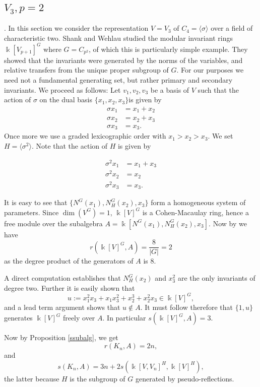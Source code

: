 \documentclass[a4paper]{amsart}
\newcommand{\kk}{\Bbbk}
\newtheorem*{Corollary of Conjecture}{Corollary of Conjecture}
\theoremstyle{definition}
\theoremstyle{remark}
\theoremstyle{Acknowledgments}
\begin{document}
\subsection{$V_3, p=2$}.
In this section we consider the representation $V =V_3$ of $C_4 = \langle \sigma \rangle$ over a field of characteristic two. Shank and Wehlau \cite{ShankWehlaupplusone} studied the modular invariant rings $\kk[V_{p+1}]^G$ where $G = C_{p^2}$, of which this is particularly simple example. They showed that the invariants were generated by the norms of the variables, and relative transfers from the unique proper subgroup of $G$. For our purposes we need not a fundamental generating set, but rather primary and secondary invariants. We proceed as follows:
Let $v_1,v_2,v_3$ be a basis of $V$ such that the action of $\sigma$ on the dual basis $\{x_1,x_2,x_3\}$is given by 
\begin{align*}\sigma x_1 &= x_1+x_2\\
\sigma x_2 &= x_2+x_3\\
\sigma x_3 &= x_3. \end{align*}
Once more we use a graded lexicographic order with $x_1>x_2>x_3$. We set $H = \langle \sigma^2 \rangle$. Note that the action of $H$ is given by

\begin{align*}\sigma^2 x_1 &= x_1+x_3\\
\sigma^2 x_2 &= x_2\\
\sigma^2 x_3 &= x_3. \end{align*}


It is easy to see that $\{N^G(x_1),N^G_H(x_2), x_3\}$ form a homogeneous system of parameters. Since $\dim(V^G)=1$, $\kk[V]^G$ is a Cohen-Macaulay ring, hence a free module over the subalgebra $A = \kk[N^G(x_1), N^G_H(x_2), x_3]$. Now by \cite[Theorem~3.71]{DerksenKemper} we have
\begin{equation}\label{rv3} r(\kk[V]^G,A) = \frac{8}{|G|} = 2 \end{equation} as the degree product of the generators of $A$ is $8$.

A direct computation establishes that $N^G_H(x_2)$ and $x_3^2$ are the only invariants of degree two. Further it is easily shown that  
$$u:= x_1^2x_3+x_1x_3^2+x_2^3+x_2^2x_3 \in \kk[V]^G,$$
and a lead term argument shows that $u \not \in A$. It must follow therefore that $\{1,u\}$ generates $\kk[V]^G$ freely over $A$.
In particular $s(\kk[V]^G,A) =3$.

Now by Proposition \ref{ssubalg}, we get 
\[r(K_n,A) = 2n,\]
and
\[s(K_n,A) = 3n+2 s(\kk[V,V_n]^H, \kk[V]^H),\]
the latter because $H$ is the subgroup of $G$ generated by pseudo-reflections.
\end{document}
